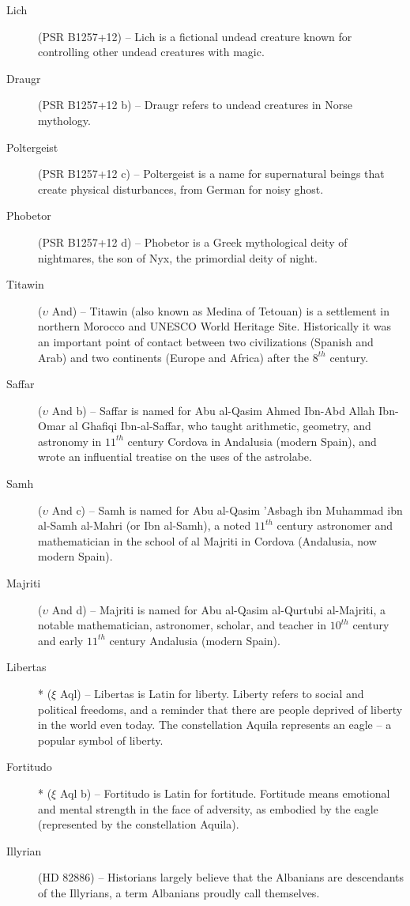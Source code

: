 \begin{description}
\item[Lich] (PSR B1257+12) -- Lich is a fictional undead creature known for controlling other undead creatures with magic.
\item[Draugr] (PSR B1257+12 b) -- Draugr refers to undead creatures in Norse mythology.
\item[Poltergeist] (PSR B1257+12 c) -- Poltergeist is a name for supernatural beings that create physical disturbances, from German for noisy ghost.
\item[Phobetor] (PSR B1257+12 d) -- Phobetor is a Greek mythological deity of nightmares, the son of Nyx, the primordial deity of night.
\item[Titawin] ($\upsilon$ And) -- Titawin (also known as Medina of Tetouan) is a settlement in northern Morocco and UNESCO World Heritage Site. Historically it was an important point of contact between two civilizations (Spanish and Arab) and two continents (Europe and Africa) after the $8^{th}$ century.
\item[Saffar] ($\upsilon$ And b) -- Saffar is named for Abu al-Qasim Ahmed Ibn-Abd Allah Ibn-Omar al Ghafiqi Ibn-al-Saffar, who taught arithmetic, geometry, and astronomy in $11^{th}$ century Cordova in Andalusia (modern Spain), and wrote an influential treatise on the uses of the astrolabe.
\item[Samh] ($\upsilon$ And c) -- Samh is named for Abu al-Qasim 'Asbagh ibn Muhammad ibn al-Samh al-Mahri (or Ibn al-Samh), a noted $11^{th}$ century astronomer and mathematician in the school of al Majriti in Cordova (Andalusia, now modern Spain).
\item[Majriti] ($\upsilon$ And d) -- Majriti is named for Abu al-Qasim al-Qurtubi al-Majriti, a notable mathematician, astronomer, scholar, and teacher in $10^{th}$ century and early $11^{th}$ century Andalusia (modern Spain).
\item[Libertas]* ($\xi$ Aql) -- Libertas is Latin for liberty. Liberty refers to social and political freedoms, and a reminder that there are people deprived of liberty in the world even today. The constellation Aquila represents an eagle -- a popular symbol of liberty.
\item[Fortitudo]* ($\xi$ Aql b) -- Fortitudo is Latin for fortitude. Fortitude means emotional and mental strength in the face of adversity, as embodied by the eagle (represented by the constellation Aquila).
\item[Illyrian] (HD 82886) -- Historians largely believe that the Albanians are descendants of the Illyrians, a term Albanians proudly call themselves.

\end{description}
